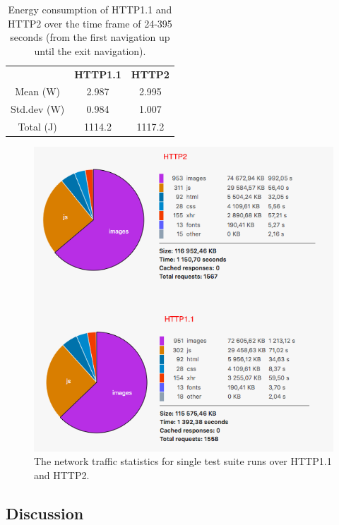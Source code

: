 \documentclass{article}
\begin{document}
\begin{table}[h!]
    \centering
    \caption{Energy consumption of HTTP1.1 and HTTP2 over the time frame of 24-395 seconds (from the first navigation up until the exit navigation).}
    \label{table:energy_consumption}
    \begin{tabular}{c|c|c}
        & \textbf{HTTP1.1} & \textbf{HTTP2}  \\
        Mean (W)   & 2.987 & 2.995 \\
        Std.dev (W) & 0.984 & 1.007 \\
        Total (J)  & 1114.2 & 1117.2 \\
    \end{tabular}
\end{table}

\begin{figure}[h!]
\centering
\includegraphics[scale=0.6]{images/http2_consumes.png}
\caption{The network traffic statistics for single test suite runs over HTTP1.1 and HTTP2.}
\label{fig:http2_network_traffic}
\end{figure}

\clearpage

\subsection{Discussion}
\label{chapter:discussion}
\end{document}
